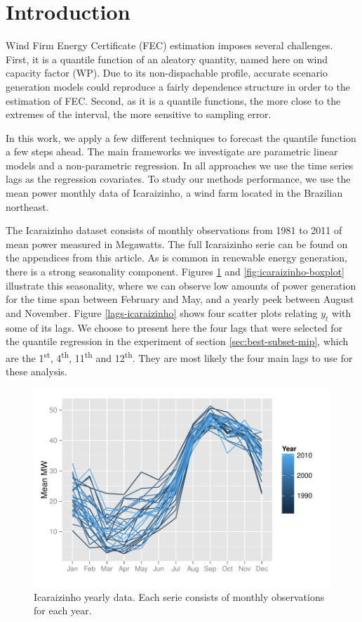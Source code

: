 \section{Introduction}

Wind Firm Energy Certificate (FEC) \cite{porrua2010wind} estimation imposes several challenges. First, it is a quantile function of an aleatory quantity, named here on wind capacity factor (WP). Due to its non-dispachable profile, accurate scenario generation models could reproduce a fairly dependence structure in order to the estimation of FEC. Second, as it is a quantile functions, the more close to the extremes of the interval, the more sensitive to sampling error.

In this work, we apply a few different techniques to forecast the quantile function a few steps ahead. The main frameworks we investigate are parametric linear models and a non-parametric regression. In all approaches we use the time series lags as the regression covariates. To study our methods performance, we use the mean power monthly data of Icaraizinho, a wind farm located in the Brazilian northeast. 

The Icaraizinho dataset consists of monthly observations from 1981 to 2011 of mean power measured in Megawatts. The full Icaraizinho serie can be found on the appendices from this article.  As is common in renewable energy generation, there is a strong seasonality component. Figures \ref{fig:icaraizinho-mensal} and \ref{fig:icaraizinho-boxplot} illustrate this seasonality, where we can observe low amounts of power generation for the time span between February and May, and a yearly peek between August and November.  
Figure \ref{lags-icaraizinho} shows four scatter plots relating $y_t$ with some of its lags. We choose to present here the four lags that were selected for the quantile regression in the experiment of section \ref{sec:best-subset-mip}, which are the 1\textsuperscript{st}, 4\textsuperscript{th}, 11\textsuperscript{th} and 12\textsuperscript{th}. They are most likely the four main lags to use for these analysis.
\begin{figure}[h]
\centering
\includegraphics[width=0.8\linewidth]{./Figuras/Icaraizinho/icaraizinho-mensal}
\caption{Icaraizinho yearly data. Each serie consists of monthly observations for each year.}
\label{fig:icaraizinho-mensal}
\end{figure}


